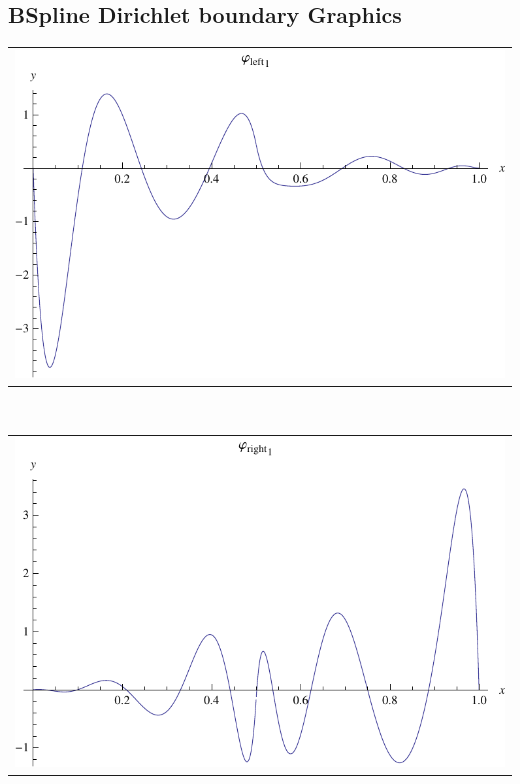 \documentclass{article}
\begin{document}
\begin{landscape}
\subsection{BSpline Dirichlet boundary Graphics}
\begin{tabular}{c}
\includegraphics[width=20.cm]{octic_bspline_dleft_1.pdf}\end{tabular} 
 \\ 
\begin{tabular}{c}
\includegraphics[width=20.cm]{octic_bspline_dright_1.pdf}\end{tabular} 
 \end{landscape}
\end{document}
